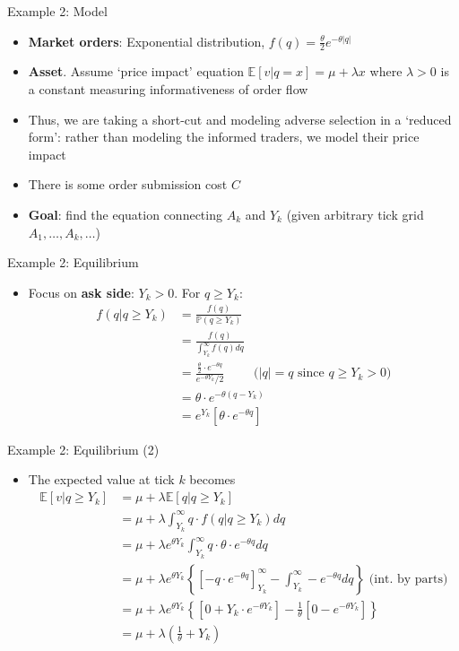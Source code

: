 \documentclass[english,10pt
,aspectratio=169
]{beamer}
\begin{document}
\begin{frame}{Example 2: Model}
	\begin{itemize}
		\item \textbf{Market orders}: Exponential distribution, $f(q)=\frac{\theta}{2} e^{-\theta|q|}$
		\item \textbf{Asset}. Assume `price impact' equation $\mathbb{E}[v|q=x] = \mu + \lambda x$ where $\lambda >0$ is a constant measuring informativeness of order flow
		\item Thus, we are taking a short-cut and modeling adverse selection in a `reduced form': rather than modeling the informed traders, we model their price impact
		\item There is some order submission cost $C$
		\item \textbf{Goal}: find the equation connecting $A_k$ and $Y_k$ (given arbitrary tick grid $A_1,\dots,A_k,\dots$)
	\end{itemize}
\end{frame}


\begin{frame}{Example 2: Equilibrium}
	\begin{itemize}
		\item Focus on \textbf{ask side}: $Y_k>0$. For $q \geq Y_{k}$:
		\begin{align*}
			f(q|q \ge Y_k)&=\frac{f(q)}{ \mathbb{P}(q \geq Y_{k})} \\
			&= \frac{f(q)}{\int^\infty_{Y_k} f(q) dq}\\
			&= \frac{\frac{\theta}{2} \cdot e^{-\theta q}}{e^{-\theta Y_{k}}/2} \quad \quad \text{ ($|q|=q$ since $q \ge Y_k>0$)}\\
			& =\theta \cdot e^{-\theta(q-Y_{k})}\\
			& = e^{Y_k} \left[ \theta \cdot e^{-\theta q} \right]
		\end{align*}
	\end{itemize}
\end{frame}


\begin{frame}{Example 2: Equilibrium (2)}
	\begin{itemize}
		\item The expected value at tick $k$ becomes
		\begin{align*}
		\mathbb{E}[v|q \geq Y_{k}] & =  \mu + \lambda \mathbb{E}[q|q \geq Y_{k}]\\
		&=\mu+ \lambda \int^\infty_{Y_k} q \cdot f(q|q \geq Y_{k}) dq\\
		&=\mu+ \lambda e^{\theta Y_{k}} \int^\infty_{Y_k} q \cdot \theta \cdot e^{-\theta q} dq\\
		& =  \mu+ \lambda e^{\theta Y_{k}} \left\{\left[- q \cdot e^{-\theta q} \right]^\infty_{Y_k} -\int^\infty_{Y_k} -e^{-\theta q} dq   \right\}\text{ (int. by parts)} \\
		& =  \mu+ \lambda e^{\theta Y_{k}} \left\{\left[0+ Y_k \cdot  e^{-\theta Y_k} \right] -\frac{1}{\theta}[0-e^{-\theta Y_k}]   \right\} \\
		& = \mu + \lambda \left( \frac{1}{\theta }+ Y_{k} \right)
		\end{align*}
	\end{itemize}
\end{frame}
\end{document}
